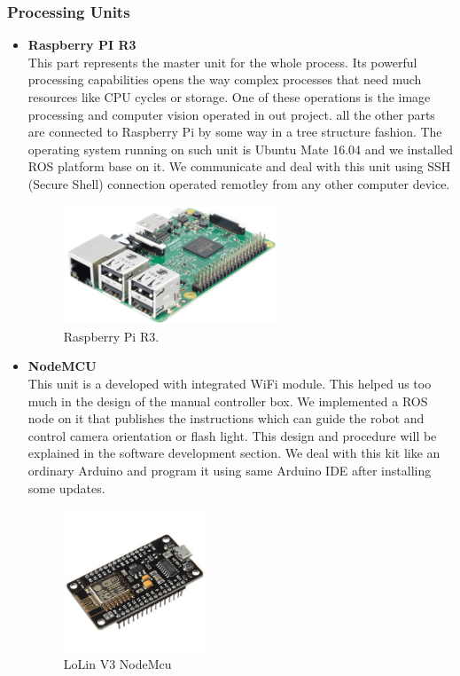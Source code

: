 \documentclass[12pt]{article}
\begin{document}
\subsubsection{Processing Units}
\begin{itemize}
	\item \textbf{Raspberry PI R3}\\
	This part represents the master unit for the whole process. Its powerful processing capabilities opens the way complex processes that need much resources like CPU cycles or storage. One of these operations is the image processing and computer vision operated in out project. all the other parts are connected to Raspberry Pi by some way in a tree structure fashion. The operating system running on such unit is Ubuntu Mate 16.04 and we installed ROS platform base on it. We communicate and deal with this unit using SSH (Secure Shell) connection operated remotley from any other computer device.
	\begin{figure}[H]
		\centering
		\includegraphics[width =0.6\textwidth]{Fig/Electronics/Raspberry.png}
		\caption{Raspberry Pi R3.}
		\label{fig:raspberry}
	\end{figure}

	\item \textbf{NodeMCU}\\
	This unit is a developed with integrated WiFi module. This helped us too much in the design of the manual controller box. We implemented a ROS node on it that publishes the instructions which can guide the robot and control camera orientation or flash light. This design and procedure will be explained in the software development section.
	We deal with this kit like an ordinary Arduino and program it using same Arduino IDE after installing some updates.
	
	\begin{figure}[H]
		\centering
		\includegraphics[width =0.4\textwidth]{Fig/Electronics/nodemcu.jpg}
		\caption{LoLin V3 NodeMcu}
		\label{fig:nodemcu}
	\end{figure}
	

\end{itemize}
\end{document}
